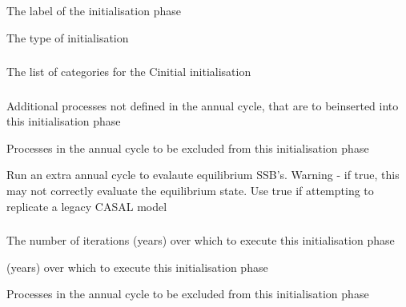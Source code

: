 
 {The label of the initialisation phase}

 {The type of initialisation}

\subsubsection[Cinitial]{}

 {The list of categories for the Cinitial initialisation}

\subsubsection[Derived]{}

 {Additional processes not defined in the annual cycle, that are to beinserted into this initialisation phase}

 {Processes in the annual cycle to be excluded from this initialisation phase}

 {Run an extra annual cycle to evalaute equilibrium SSB's. Warning - if true, this may not correctly evaluate the equilibrium state. Use true if attempting to replicate a legacy CASAL model}

\subsubsection[Iterative]{}

 {The number of iterations (years) over which to execute this initialisation phase}

 {(years) over which to execute this initialisation phase}

 {Processes in the annual cycle to be excluded from this initialisation phase}

